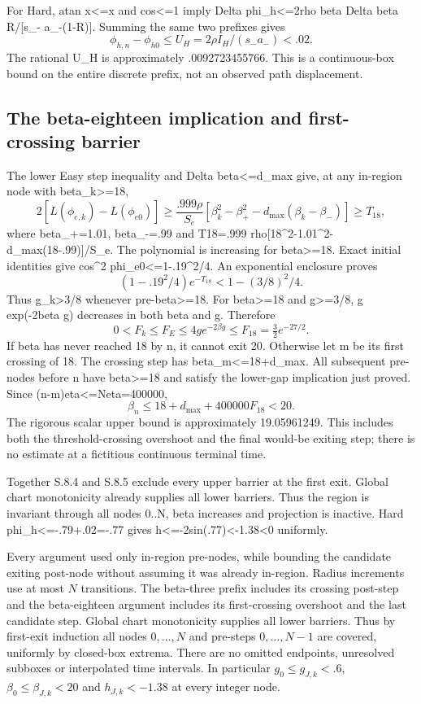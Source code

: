 \documentclass[11pt,a4paper]{article}
\begin{document}
For Hard, atan x<=x and cos<=1 imply
Delta phi\_h<=2rho beta Delta beta R/[s\_- a\_-(1-R)].
Summing the same two prefixes gives
\[
 \phi_{h,n}-\phi_{h0}\le U_H=2\rho I_H/(s_-a_-)<.02.
\]
The rational U\_H is approximately .0092723455766. This is a continuous-box
bound on the entire discrete prefix, not an observed path displacement.

\subsection{The beta-eighteen implication and first-crossing barrier}

The lower Easy step inequality and Delta beta<=d\_max give, at any in-region
node with beta\_k>=18,
\[
 2[L(\phi_{e,k})-L(\phi_{e0})]\ge
 \frac{.999\rho}{S_e}
 [\beta_k^2-\beta_+^2-d_{\max}(\beta_k-\beta_-)]
 \ge T_{18},
\]
where beta\_+=1.01, beta\_-=.99 and
T18=.999 rho[18\textasciicircum{}2-1.01\textasciicircum{}2-d\_max(18-.99)]/S\_e.
The polynomial is increasing for beta>=18. Exact initial identities give
cos\textasciicircum{}2 phi\_e0<=1-.19\textasciicircum{}2/4. An exponential enclosure proves
\[
 (1-.19^2/4)e^{-T_{18}}<1-(3/8)^2/4.
\]
Thus g\_k>3/8 whenever pre-beta>=18. For beta>=18 and g>=3/8,
g exp(-2beta g) decreases in both beta and g. Therefore
\[
 0<F_k\le F_E\le4g e^{-2\beta g}
 \le F_{18}=\tfrac32e^{-27/2}.
\]
If beta has never reached 18 by n, it cannot exit 20.
Otherwise let m be its first crossing of 18. The crossing step has
beta\_m<=18+d\_max. All subsequent pre-nodes before n have beta>=18 and
satisfy the lower-gap implication just proved. Since (n-m)eta<=Neta=400000,
\[
 \beta_n\le18+d_{\max}+400000F_{18}<20.
\]
The rigorous scalar upper bound is approximately 19.05961249.
This includes both the threshold-crossing overshoot and the final would-be
exiting step; there is no estimate at a fictitious continuous terminal time.

Together S.8.4 and S.8.5 exclude every upper barrier at the first exit.
Global chart monotonicity already supplies all lower barriers.
Thus the region is invariant through all nodes 0..N, beta increases and
projection is inactive. Hard phi\_h<=-.79+.02=-.77 gives
h<=-2sin(.77)<-1.38<0 uniformly.


Every argument used only in-region pre-nodes, while bounding the candidate exiting post-node without assuming it was already in-region. Radius increments use at most $N$ transitions. The beta-three prefix includes its crossing post-step and the beta-eighteen argument includes its first-crossing overshoot and the last candidate step. Global chart monotonicity supplies all lower barriers. Thus by first-exit induction all nodes $0,\ldots,N$ and pre-steps $0,\ldots,N-1$ are covered, uniformly by closed-box extrema. There are no omitted endpoints, unresolved subboxes or interpolated time intervals. In particular $g_0\le g_{J,k}<.6$, $\beta_0\le\beta_{J,k}<20$ and $h_{J,k}<-1.38$ at every integer node.
\end{document}
